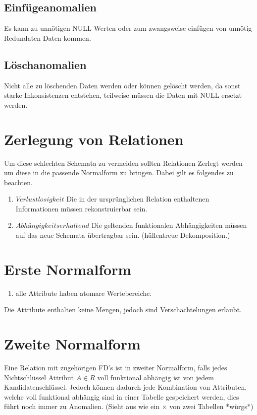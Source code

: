 \subsection{Einfügeanomalien}
Es kann zu unnötigen NULL Werten oder zum zwangsweise einfügen von unnötig Redundaten Daten kommen. 
\subsection{Löschanomalien}
Nicht alle zu löschenden Daten werden oder können gelöscht werden, da sonst starke Inkonsistenzen entstehen, teilweise müssen die Daten mit NULL ersetzt werden. 

\section{Zerlegung von Relationen}
Um diese schlechten Schemata zu vermeiden sollten Relationen Zerlegt werden um diese in die passende Normalform zu bringen. Dabei gilt es folgendes zu beachten. 
\begin{enumerate}
\item $Verlustlosigkeit$ Die in der ursprünglichen Relation enthaltenen Informationen müssen rekonstruierbar sein. 
\item $Abhängigkeitserhaltend$ Die geltenden funktionalen Abhängigkeiten müssen auf das neue Schemata übertragbar sein. (hüllentreue Dekomposition.)
\end{enumerate}

\section{Erste Normalform}
\begin{enumerate}
\item alle Attribute haben atomare Wertebereiche.
\end{enumerate}
Die Attribute enthalten keine Mengen, jedoch sind Verschachtelungen erlaubt.
\section{Zweite Normalform} 
Eine Relation mit zugehörigen FD's ist in zweiter Normalform, falls jedes Nichtschlüssel Attribut $A \in R$ voll funktional abhängig ist von jedem Kandidatenschlüssel. Jedoch können dadurch jede Kombination von Attributen, welche voll funktional abhängig sind in einer Tabelle gespeichert werden, dies führt noch immer zu Anomalien. (Sieht aus wie ein $\times$ von zwei Tabellen *würgs*)

